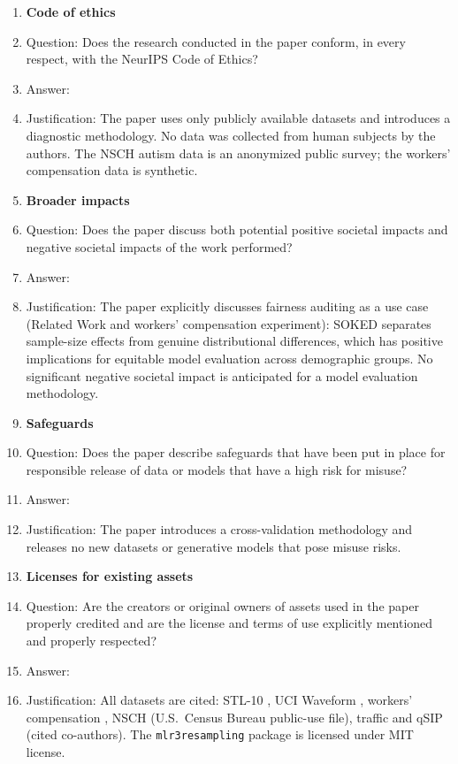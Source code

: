\begin{enumerate}
\item {\bf Code of ethics}
    \item[] Question: Does the research conducted in the paper conform, in every respect, with the NeurIPS Code of Ethics?
    \item[] Answer: \answerYes{}
    \item[] Justification: The paper uses only publicly available datasets and introduces a diagnostic methodology. No data was collected from human subjects by the authors. The NSCH autism data is an anonymized public survey; the workers' compensation data is synthetic.

\item {\bf Broader impacts}
    \item[] Question: Does the paper discuss both potential positive societal impacts and negative societal impacts of the work performed?
    \item[] Answer: \answerYes{}
    \item[] Justification: The paper explicitly discusses fairness auditing as a use case (Related Work and workers' compensation experiment): SOKED separates sample-size effects from genuine distributional differences, which has positive implications for equitable model evaluation across demographic groups. No significant negative societal impact is anticipated for a model evaluation methodology.

\item {\bf Safeguards}
    \item[] Question: Does the paper describe safeguards that have been put in place for responsible release of data or models that have a high risk for misuse?
    \item[] Answer: \answerNA{}
    \item[] Justification: The paper introduces a cross-validation methodology and releases no new datasets or generative models that pose misuse risks.

\item {\bf Licenses for existing assets}
    \item[] Question: Are the creators or original owners of assets used in the paper properly credited and are the license and terms of use explicitly mentioned and properly respected?
    \item[] Answer: \answerYes{}
    \item[] Justification: All datasets are cited: STL-10 \citep{coates2011stl10}, UCI Waveform \citep{breiman1984classification}, workers' compensation \citep{Ali2020}, NSCH (U.S.\ Census Bureau public-use file), traffic and qSIP (cited co-authors). The \texttt{mlr3resampling} package is licensed under MIT license.


\end{enumerate}
